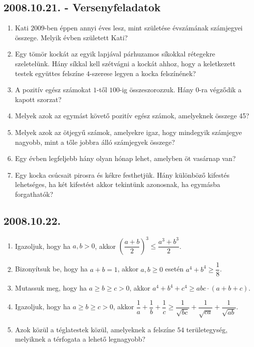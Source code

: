 \documentclass{article}
\begin{document}
\subsection*{2008.10.21. - Versenyfeladatok}
\begin{enumerate}
\item Kati $2009$-ben éppen annyi éves lesz, mint születése évszámának számjegyei összege. Melyik évben született Kati?
\item Egy tömör kockát az egyik lapjával párhuzamos síkokkal rétegekre szeletelünk. Hány síkkal kell szétvágni a kockát ahhoz, hogy a keletkezett testek együttes felszíne $4$-szerese legyen a kocka felszínének?
\item A pozitív egész számokat $1$-től $100$-ig összeszorozzuk. Hány $0$-ra végződik a kapott szorzat?
\item Melyek azok az egymást követő pozitív egész számok, amelyeknek összege 45? 
\item Melyek azok az ötjegyű számok, amelyekre igaz, hogy mindegyik számjegye nagyobb, mint a tőle jobbra álló számjegyek összege?
\item Egy évben legfeljebb hány olyan hónap lehet, amelyben öt vasárnap van?
\item Egy kocka csúcsait pirosra és kékre festhetjük. Hány különböző kifestés lehetséges, ha két kifestést akkor tekintünk azonosnak, ha egymásba forgathatók?
\end{enumerate}
\subsection*{2008.10.22.}
\begin{enumerate}
\item Igazoljuk, hogy ha $a,b>0$, akkor $\left(\dfrac{a+b}{2}\right)^3\leq \dfrac{a^3+b^3}{2}$.  
\item Bizonyítsuk be, hogy ha $a+b=1$, akkor $a,b\geq 0$ esetén $a^4+b^4\geq \dfrac{1}{8}$.
\item Mutassuk meg, hogy ha $a\geq b\geq c>0$, akkor $a^4+b^4+c^4\geq abc\cdot(a+b+c)$.
\item Igazoljuk, hogy ha $a\geq b\geq c>0$, akkor $\dfrac{1}{a}+\dfrac{1}{b}+\dfrac{1}{c}\geq \dfrac{1}{\sqrt{bc}}+\dfrac{1}{\sqrt{ca}}+\dfrac{1}{\sqrt{ab}}$.
\item Azok közül a téglatestek közül, amelyeknek a felszíne $54$ területegység, melyiknek a térfogata a lehető legnagyobb?
\end{enumerate}
\end{document}
